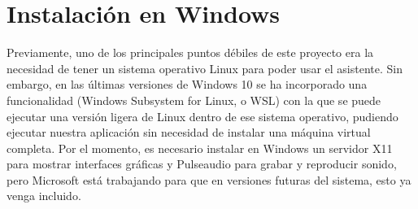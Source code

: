 \section{Instalación en Windows}
Previamente, uno de los principales puntos débiles de este proyecto era la necesidad de tener un sistema operativo Linux para poder usar el asistente. Sin embargo, en las últimas versiones de Windows 10 se ha incorporado una funcionalidad (Windows Subsystem for Linux, o WSL) con la que se puede ejecutar una versión ligera de Linux dentro de ese sistema operativo, pudiendo ejecutar nuestra aplicación sin necesidad de instalar una máquina virtual completa. Por el momento, es necesario instalar en Windows un servidor X11 para mostrar interfaces gráficas y Pulseaudio para grabar y reproducir sonido, pero Microsoft está trabajando para que en versiones futuras del sistema, esto ya venga incluido.